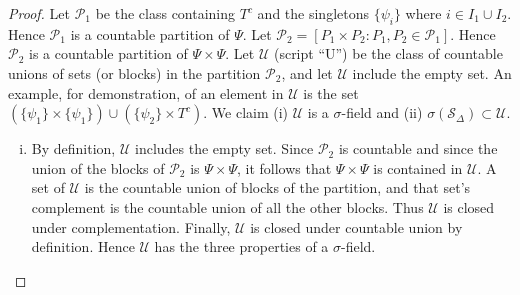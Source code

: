 \documentclass[letterpaper, 12pt]{article}
\newcommand{\cP}{\mathcal{P}}
\newcommand{\cS}{\mathcal{S}}
\newcommand{\sU}{\mathscr{U}}
\begin{document}
\begin{enumerate}
\begin{proof}
Let $\cP_1$ be the class containing $T^c$ and the singletons $\{\psi_i\}$ where $i \in I_1 \cup I_2$. 
Hence $\cP_1$ is a countable partition of $\Psi$. 
Let $ \cP_2 = [P_1 \times P_2 : P_1, P_2 \in \cP_1]$.
Hence $\cP_2$ is a countable partition of $\Psi \times \Psi$.
Let $\sU$ (script ``U'') be the class of countable unions of sets (or blocks) in the partition $ \cP_2$, and let $\sU$ include the empty set.
An example, for demonstration, of an element in $\sU$ is the set $(\{\psi_1\} \times \{\psi_1\}) \cup (\{\psi_2\} \times T^c)$. 
We claim (i) $\sU$ is a $\sigma$-field and (ii) $\sigma(\cS_\Delta) \subset \sU$.
\begin{enumerate}[(i)]
\item
By definition, $\sU$ includes the empty set. 
Since $\cP_2$ is countable and since the union of the blocks of $\cP_2$ is $\Psi \times \Psi$, it follows that $\Psi \times \Psi$ is contained in $\sU$. 
A set of $\sU$ is the countable union of blocks of the partition, and that set's complement is the countable union of all the other blocks. 
Thus $\sU$ is closed under complementation.
Finally, $\sU$ is closed under countable union by definition. 
Hence $\sU$ has the three properties of a $\sigma$-field.


\end{enumerate}
\end{proof}
\end{enumerate}
\end{document}
